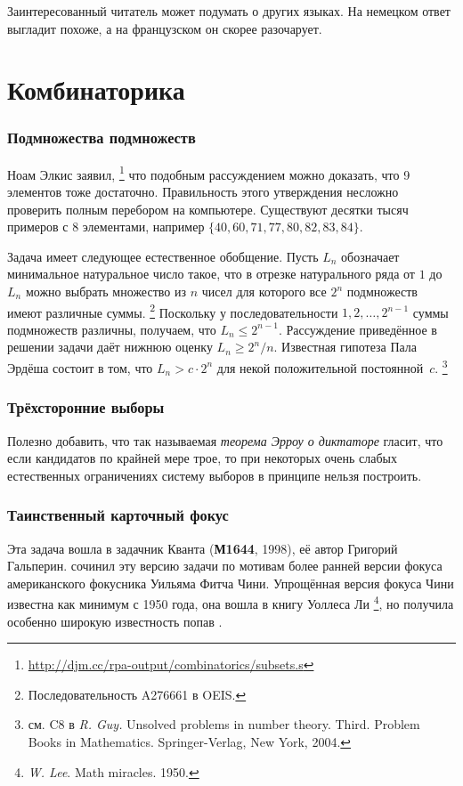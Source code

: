 \documentclass[twoside]{book}
\begin{document}
Заинтересованный читатель может подумать о других языках.
На немецком ответ выгладит похоже, а на французском он скорее разочарует.

\section{Комбинаторика}

\subsubsection*{Подмножества подмножеств}
Ноам Элкис заявил,%
\footnote{\url{http://djm.cc/rpa-output/combinatorics/subsets.s}} что подобным рассуждением можно доказать, что 9 элементов тоже достаточно.
Правильность этого утверждения несложно проверить полным перебором на компьютере.
Существуют десятки тысяч примеров с 8 элементами, например $\{40,60,71,77,80,82,83,84\}$. 

Задача имеет следующее естественное обобщение.
Пусть $L_n$ обозначает минимальное натуральное число такое,
что в отрезке натурального ряда от $1$ до $L_n$ можно выбрать множество из $n$ чисел для которого все $2^n$ подмножеств имеют различные суммы.%
\footnote{Последовательность A276661 в OEIS.}
Поскольку у последовательности $1,2,\dots, 2^{n-1}$ суммы подмножеств различны, получаем, что $L_n\le 2^{n-1}$.
Рассуждение приведённое в решении задачи даёт нижнюю оценку $L_n\ge 2^n/n$.
Известная гипотеза Пала Эрдёша состоит в том, что $L_n>c\cdot 2^n$ для некой положительной постоянной~$c$.%
\footnote{см. C8 в \emph{R. Guy.} Unsolved problems in number theory. Third. Problem Books in Mathematics.
Springer-Verlag, New York, 2004.}


\subsubsection{Трёхсторонние выборы}
Полезно добавить, что так называемая
\textit{теорема Эрроу о диктаторе} гласит, что если кандидатов по крайней мере трое, то при некоторых очень слабых естественных ограничениях систему выборов в принципе нельзя построить.

\subsubsection{Таинственный карточный фокус}
Эта задача вошла в задачник Кванта (\textbf{М1644}, 1998), её автор Григорий Гальперин.  сочинил эту версию задачи по мотивам более ранней версии фокуса американского фокусника Уильяма Фитча Чини.
Упрощённая версия фокуса Чини известна как минимум с 1950 года,
она вошла в книгу Уоллеса Ли
%
\footnote{\emph{W. Lee}. Math miracles. 1950.},
но получила особенно широкую известность попав . 
\end{document}
